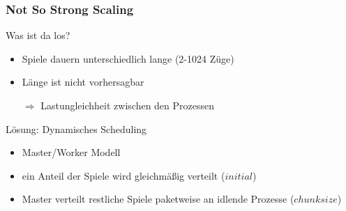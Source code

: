 \begin{frame}
    \frametitle{Not So Strong Scaling}

    Was ist da los?
    \begin{itemize}
        \item Spiele dauern unterschiedlich lange (2-1024 Züge)
        \item Länge ist nicht vorhersagbar
        \item[$\Rightarrow$] Lastungleichheit zwischen den Prozessen
    \end{itemize}

    \pause
    \hfill

    Lösung: Dynamisches Scheduling
    \begin{itemize}
        \item Master/Worker Modell
        \item ein Anteil der Spiele wird gleichmäßig verteilt ($initial$)
        \item Master verteilt restliche Spiele paketweise an idlende Prozesse
              ($chunksize$)
    \end{itemize}

\end{frame}

